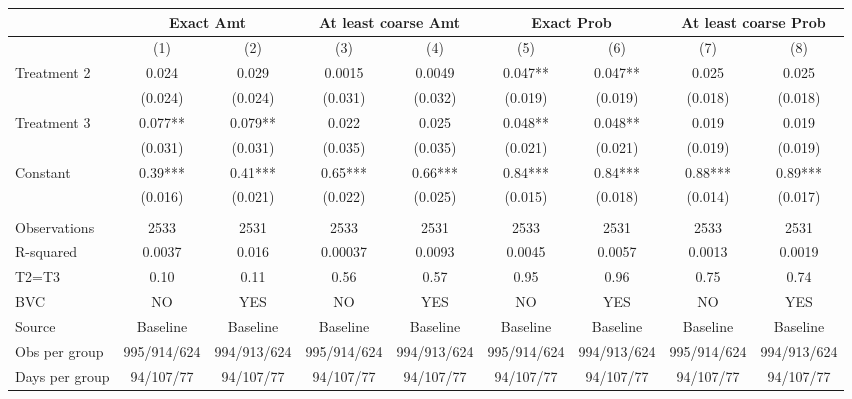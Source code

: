 \begin{tabular}{lcccccccc}
\toprule
      & \multicolumn{2}{c}{Exact Amt} & \multicolumn{2}{c}{At least coarse Amt} & \multicolumn{2}{c}{Exact Prob} & \multicolumn{2}{c}{At least coarse Prob} \\
\midrule
      & (1)   & (2)   & (3)   & (4)   & (5)   & (6)   & (7)   & (8) \\
\midrule
Treatment 2 & 0.024 & 0.029 & 0.0015 & 0.0049 & 0.047** & 0.047** & 0.025 & 0.025 \\
      & (0.024) & (0.024) & (0.031) & (0.032) & (0.019) & (0.019) & (0.018) & (0.018) \\
Treatment 3 & 0.077** & 0.079** & 0.022 & 0.025 & 0.048** & 0.048** & 0.019 & 0.019 \\
      & (0.031) & (0.031) & (0.035) & (0.035) & (0.021) & (0.021) & (0.019) & (0.019) \\
Constant & 0.39*** & 0.41*** & 0.65*** & 0.66*** & 0.84*** & 0.84*** & 0.88*** & 0.89*** \\
      & (0.016) & (0.021) & (0.022) & (0.025) & (0.015) & (0.018) & (0.014) & (0.017) \\
      &       &       &       &       &       &       &       &  \\
\midrule
Observations & 2533  & 2531  & 2533  & 2531  & 2533  & 2531  & 2533  & 2531 \\
R-squared & 0.0037 & 0.016 & 0.00037 & 0.0093 & 0.0045 & 0.0057 & 0.0013 & 0.0019 \\
T2=T3 & 0.10  & 0.11  & 0.56  & 0.57  & 0.95  & 0.96  & 0.75  & 0.74 \\
BVC   & NO    & YES   & NO    & YES   & NO    & YES   & NO    & YES \\
Source & Baseline & Baseline & Baseline & Baseline & Baseline & Baseline & Baseline & Baseline \\
Obs per group & 995/914/624 & 994/913/624 & 995/914/624 & 994/913/624 & 995/914/624 & 994/913/624 & 995/914/624 & 994/913/624 \\
Days per group & 94/107/77 & 94/107/77 & 94/107/77 & 94/107/77 & 94/107/77 & 94/107/77 & 94/107/77 & 94/107/77 \\
\bottomrule
\bottomrule
\end{tabular}%
